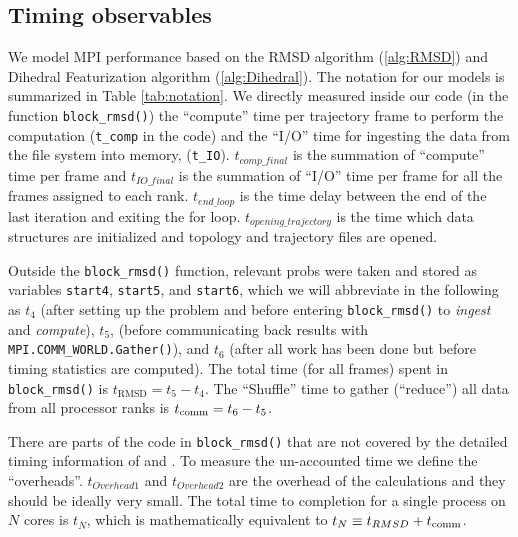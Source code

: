 \label{methods}
\subsection{Timing observables}
We model MPI performance based on the RMSD algorithm (\ref{alg:RMSD}) and Dihedral Featurization algorithm (\ref{alg:Dihedral}). 
The notation for our models is summarized in Table \ref{tab:notation}.
We directly measured inside our code (in the function \texttt{block\_rmsd()}) the ``compute'' time per
trajectory frame to perform the computation (\texttt{t\_comp} in the code) and the ``I/O'' time for
ingesting the data from the file system into memory, (\texttt{t\_IO}). 
$t_{comp\_final}$ is the summation of ``compute'' time per frame and $t_{IO\_final}$ is the summation of ``I/O'' time per frame for all the frames assigned to each rank. 
$t_{end\_loop}$ is the time delay between the end of the last iteration and exiting the for loop.
$t_{opening\_trajectory}$ is the time which data structures are initialized and topology and trajectory files are opened.

Outside the \texttt{block\_rmsd()} function, relevant probs were taken and stored as variables \texttt{start4},
\texttt{start5}, and \texttt{start6}, which we will abbreviate in the following as $t_{4}$ (after setting up the problem
and before entering \texttt{block\_rmsd()} to \emph{ingest} and \emph{compute}), $ t_{5}$, (before communicating back results with
\texttt{MPI.COMM\_WORLD.Gather()}), and $t_{6}$ (after all work has been done but before timing statistics are computed).  
The total time (for all frames) spent in \texttt{block\_rmsd()} is $t_{\text{RMSD}} = t_{5} - t_{4}$. 
The ``Shuffle'' time to gather (``reduce'') all data from all processor ranks is $t_{\text{comm}} = t_{6} - t_{5}$.

There are parts of the code in \texttt{block\_rmsd()} that are not covered by the detailed timing information of \tcomp and \tIO. 
To measure the un-accounted time we define the ``overheads''.
$t_{Overhead1}$ and $t_{Overhead2}$ are the overhead of the calculations and they should be ideally very small.  
The total time to completion for a single process on $N$ cores is $t_{N}$, which is mathematically equivalent to
$t_{N} \equiv t_{RMSD} + t_{\text{comm}}$.

